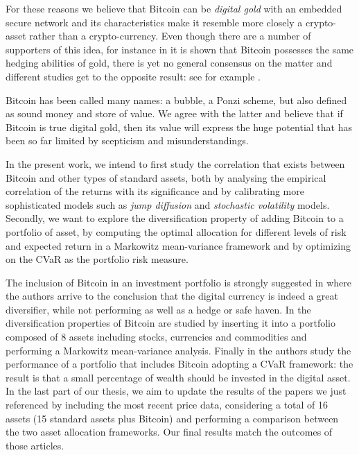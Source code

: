 \bigskip
For these reasons we believe that Bitcoin can be  \textit{digital gold} with an embedded secure network and its characteristics make it resemble more closely a crypto-asset rather than a crypto-currency.
Even though there are a number of supporters of this idea, for instance in \citep{DYHRBERG2016} it is shown that Bitcoin possesses the same hedging abilities of gold, there is yet no general consensus on the matter and different studies get to the opposite result: see for example \citep{KLEIN2018}.

Bitcoin has been called many names: a bubble, a Ponzi scheme, but also defined as sound money and store of value. We agree with the latter and believe that if Bitcoin is  true digital gold, then its value will express the huge potential that has been so far limited by scepticism and misunderstandings.

\bigskip

In the present work, we intend to first study the correlation that exists between Bitcoin and other types of standard assets, both by analysing the empirical correlation of the returns with its significance and by calibrating more sophisticated models such as \textit{jump diffusion} and \textit{stochastic volatility} models.
Secondly, we want to explore the diversification property of adding Bitcoin to a portfolio of asset, by computing the optimal allocation for different levels of risk and expected return in a Markowitz mean-variance framework and by optimizing on the CVaR as the portfolio risk measure.

\bigskip

The inclusion of Bitcoin in an investment portfolio is strongly suggested in \citep{hedge_safe_haven} where the authors arrive to the conclusion that the digital currency is indeed a great diversifier, while not performing as well as a hedge or safe haven. In \citep{andrianto} the diversification properties of Bitcoin are studied by inserting it into a portfolio composed of 8 assets including stocks, currencies and commodities and performing a Markowitz mean-variance analysis.
Finally in \citep{caveat_emptor} the authors study the performance of a portfolio that includes Bitcoin  adopting a CVaR framework: the result is that a small percentage of wealth should be invested in the digital asset.
In the last part of our thesis, we aim to update the results of the papers we just referenced by including the most recent price data, considering a total of 16 assets (15 standard assets plus Bitcoin) and performing a comparison between the two asset allocation frameworks.
Our final results match the outcomes of those articles.

